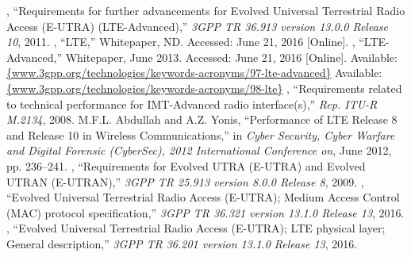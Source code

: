 %

\begin{thebibliography}{99.}%
	, ``Requirements for further advancements for Evolved Universal Terrestrial Radio Access (E-UTRA) (LTE-Advanced),'' \emph{{3GPP TR 36.913 version 13.0.0 Release 10}}, 2011.
	, ``{LTE},'' Whitepaper, ND. Accessed: June 21, 2016 [Online].
	, ``{LTE-Advanced},'' Whitepaper, June 2013. Accessed: June 21, 2016 [Online]. Available: \url{{www.3gpp.org/technologies/keywords-acronyms/97-lte-advanced}} Available: \url{{www.3gpp.org/technologies/keywords-acronyms/98-lte}}
	, ``Requirements related to technical performance for IMT-Advanced radio interface(s),'' \emph{Rep. ITU-R M.2134}, 2008. 
	 {M.F.L. Abdullah and A.Z. Yonis}, ``{Performance of LTE Release 8 and Release 10 in Wireless Communications},'' in \emph{{Cyber Security, Cyber Warfare and Digital Forensic (CyberSec), 2012 International Conference on}}, June 2012, pp. 236--241.
	, ``Requirements for Evolved UTRA (E-UTRA) and Evolved UTRAN (E-UTRAN),'' \emph{{3GPP TR 25.913 version 8.0.0 Release 8}}, 2009.
	, ``Evolved Universal Terrestrial Radio Access (E-UTRA); Medium Access Control (MAC) protocol specification,'' \emph{{3GPP TR 36.321 version 13.1.0 Release 13}}, 2016.
	, ``Evolved Universal Terrestrial Radio Access (E-UTRA); LTE physical layer; General description,'' \emph{{3GPP TR 36.201 version 13.1.0 Release 13}}, 2016.	
\end{thebibliography}